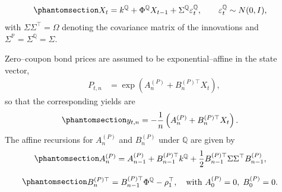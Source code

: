 \documentclass[
  letterpaper,
  DIV=11,
  numbers=noendperiod]{scrreprt}
\begin{document}
\begin{equation}\protect\phantomsection\label{eq-factorVarQ-2}{
\begin{align}
X_t &= k^{\mathbb{Q}} + \Phi^{\mathbb{Q}} X_{t-1}
        + \Sigma^{\mathbb{Q}} \varepsilon_t^{\mathbb{Q}},
        \qquad \varepsilon_t^{\mathbb{Q}} \sim N(0,I),
\end{align}
}\end{equation} with \(\Sigma \Sigma^{\top} = \Omega\) denoting the
covariance matrix of the innovations and
\(\Sigma^{\mathbb{P}} = \Sigma^{\mathbb{Q}} = \Sigma\).

Zero--coupon bond prices are assumed to be exponential--affine in the
state vector,
\begin{align}
P_{t,n}
&= \exp\!\left( A_n^{(P)} + B_n^{(P)\top} X_t \right),
\end{align}
so that the corresponding yields are
\begin{equation}\protect\phantomsection\label{eq-TRM-yield-price-convention}{
\begin{align}
y_{t,n}
&= -\frac{1}{n} \left( A_n^{(P)} + B_n^{(P)\top} X_t \right).
\end{align}
}\end{equation} The affine recursions for \(A_n^{(P)}\) and
\(B_n^{(P)}\) under \(\mathbb{Q}\) are given by
\begin{equation}\protect\phantomsection\label{eq-TRM-A-recursion}{
\begin{align}
A_n^{(P)}
&= A_{n-1}^{(P)} + B_{n-1}^{(P)\top} k^{\mathbb{Q}}
    + \frac{1}{2} B_{n-1}^{(P)\top} \Sigma \Sigma^{\top} B_{n-1}^{(P)}, 
\end{align}
}\end{equation}

\begin{equation}\protect\phantomsection\label{eq-TRM-B-recursion}{
\begin{align}
B_n^{(P)\top}
&= B_{n-1}^{(P)\top} \Phi^{\mathbb{Q}} - \rho_1^{\top},
\quad \text{with } A_0^{(P)} = 0, \; B_0^{(P)} = 0.
\end{align}
}\end{equation}
\end{document}
